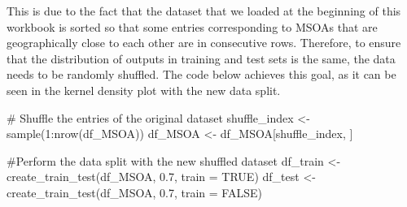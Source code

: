 \documentclass[
  letterpaper,
  DIV=11,
  numbers=noendperiod]{scrreprt}
\newenvironment{Shaded}{\begin{snugshade}}{\end{snugshade}}
\newcommand{\AttributeTok}[1]{\textcolor[rgb]{0.40,0.45,0.13}{#1}}
\newcommand{\CommentTok}[1]{\textcolor[rgb]{0.37,0.37,0.37}{#1}}
\newcommand{\ConstantTok}[1]{\textcolor[rgb]{0.56,0.35,0.01}{#1}}
\newcommand{\DecValTok}[1]{\textcolor[rgb]{0.68,0.00,0.00}{#1}}
\newcommand{\FloatTok}[1]{\textcolor[rgb]{0.68,0.00,0.00}{#1}}
\newcommand{\FunctionTok}[1]{\textcolor[rgb]{0.28,0.35,0.67}{#1}}
\newcommand{\NormalTok}[1]{\textcolor[rgb]{0.00,0.23,0.31}{#1}}
\newcommand{\OtherTok}[1]{\textcolor[rgb]{0.00,0.23,0.31}{#1}}
\newcommand{\SpecialCharTok}[1]{\textcolor[rgb]{0.37,0.37,0.37}{#1}}
\newcommand{\StringTok}[1]{\textcolor[rgb]{0.13,0.47,0.30}{#1}}
\begin{document}
This is due to the fact that the dataset that we loaded at the beginning
of this workbook is sorted so that some entries corresponding to MSOAs
that are geographically close to each other are in consecutive rows.
Therefore, to ensure that the distribution of outputs in training and
test sets is the same, the data needs to be randomly shuffled. The code
below achieves this goal, as it can be seen in the kernel density plot
with the new data split.

\begin{Shaded}
\begin{Highlighting}[]
\CommentTok{\# Shuffle the entries of the original dataset}
\NormalTok{shuffle\_index }\OtherTok{\textless{}{-}} \FunctionTok{sample}\NormalTok{(}\DecValTok{1}\SpecialCharTok{:}\FunctionTok{nrow}\NormalTok{(df\_MSOA))}
\NormalTok{df\_MSOA }\OtherTok{\textless{}{-}}\NormalTok{ df\_MSOA[shuffle\_index, ]}
\end{Highlighting}
\end{Shaded}

\begin{Shaded}
\begin{Highlighting}[]
\CommentTok{\#Perform the data split with the new shuffled dataset}
\NormalTok{df\_train }\OtherTok{\textless{}{-}} \FunctionTok{create\_train\_test}\NormalTok{(df\_MSOA, }\FloatTok{0.7}\NormalTok{, }\AttributeTok{train =} \ConstantTok{TRUE}\NormalTok{)}
\NormalTok{df\_test }\OtherTok{\textless{}{-}} \FunctionTok{create\_train\_test}\NormalTok{(df\_MSOA, }\FloatTok{0.7}\NormalTok{, }\AttributeTok{train =} \ConstantTok{FALSE}\NormalTok{)}
\end{Highlighting}
\end{Shaded}

\begin{Shaded}
\end{Shaded}
\end{document}
